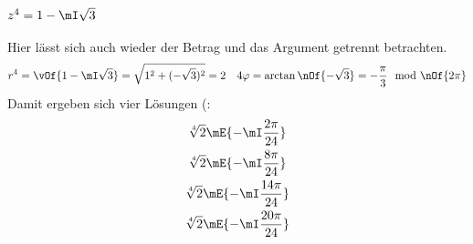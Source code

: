 	\subsection{$z^4 = 1 - \mI \sqrt{3}$}
	Hier lässt sich auch wieder der Betrag und das Argument getrennt betrachten.
	\begin{equation}
		r^4 = \vOf{1-\mI\sqrt{3}} = \sqrt{1^2 + (-\sqrt{3})^2} = 2 \quad 4\varphi = \arctan\nOf{-\sqrt{3}} = -\frac{\pi}{3} \mod\nOf{2\pi}
	\end{equation}
	Damit ergeben sich vier Lösungen (:
	\begin{gather}
		\sqrt[4]{2} \mE{-\mI\frac{2\pi}{24}} \\
		\sqrt[4]{2} \mE{-\mI\frac{8\pi}{24}} \\
		\sqrt[4]{2} \mE{-\mI\frac{14\pi}{24}} \\
		\sqrt[4]{2} \mE{-\mI\frac{20\pi}{24}} \\
	\end{gather}